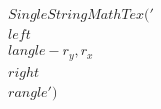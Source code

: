 \documentclass[preview]{standalone}
\begin{document}
\begin{align*}
SingleStringMathTex('\\left\\langle -r_y,r_x \\right\\rangle')
\end{align*}
\end{document}

